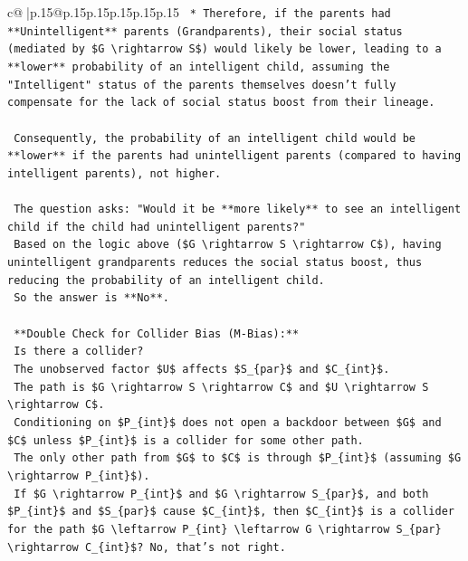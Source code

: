 \documentclass{article}
\begin{document}
{\begin{supertabular}{c@{$\;$}|p{.15\linewidth}@{}p{.15\linewidth}p{.15\linewidth}p{.15\linewidth}p{.15\linewidth}p{.15\linewidth}}
{{{\texttt{    *   Therefore, if the parents had **Unintelligent** parents (Grandparents), their social status (mediated by \$G \textbackslash{}rightarrow S\$) would likely be lower, leading to a **lower** probability of an intelligent child, assuming the "Intelligent" status of the parents themselves doesn't fully compensate for the lack of social status boost from their lineage.} \\
\\ 
\texttt{    Consequently, the probability of an intelligent child would be **lower** if the parents had unintelligent parents (compared to having intelligent parents), not higher.} \\
\\ 
\texttt{    The question asks: "Would it be **more likely** to see an intelligent child if the child had unintelligent parents?"} \\
\texttt{    Based on the logic above (\$G \textbackslash{}rightarrow S \textbackslash{}rightarrow C\$), having unintelligent grandparents reduces the social status boost, thus reducing the probability of an intelligent child.} \\
\texttt{    So the answer is **No**.} \\
\\ 
\texttt{    **Double Check for Collider Bias (M{-}Bias):**} \\
\texttt{    Is there a collider?} \\
\texttt{    The unobserved factor \$U\$ affects \$S\_\{par\}\$ and \$C\_\{int\}\$.} \\
\texttt{    The path is \$G \textbackslash{}rightarrow S \textbackslash{}rightarrow C\$ and \$U \textbackslash{}rightarrow S \textbackslash{}rightarrow C\$.} \\
\texttt{    Conditioning on \$P\_\{int\}\$ does not open a backdoor between \$G\$ and \$C\$ unless \$P\_\{int\}\$ is a collider for some other path.} \\
\texttt{    The only other path from \$G\$ to \$C\$ is through \$P\_\{int\}\$ (assuming \$G \textbackslash{}rightarrow P\_\{int\}\$).} \\
\texttt{    If \$G \textbackslash{}rightarrow P\_\{int\}\$ and \$G \textbackslash{}rightarrow S\_\{par\}\$, and both \$P\_\{int\}\$ and \$S\_\{par\}\$ cause \$C\_\{int\}\$, then \$C\_\{int\}\$ is a collider for the path \$G \textbackslash{}leftarrow P\_\{int\} \textbackslash{}leftarrow G \textbackslash{}rightarrow S\_\{par\} \textbackslash{}rightarrow C\_\{int\}\$? No, that's not right.} \\
}}}
\end{supertabular}}
\end{document}
